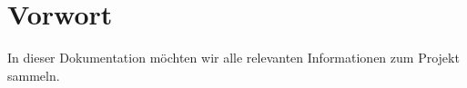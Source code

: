 \section{Vorwort}
In dieser Dokumentation möchten wir alle relevanten Informationen zum Projekt sammeln.